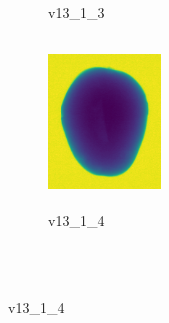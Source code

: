 \documentclass[11pt]{article}
\begin{document}
\begin{figure}
\begin{subfigure}[b]{0.15\textwidth}
        \caption{v13\_1\_3}
         \label{fig:five over x}
     \end{subfigure}
     \hfill
    \begin{subfigure}[b]{0.15\textwidth}
         \centering
         \includegraphics[width=3cm, height=4.5cm]{images/kartofler/v13_1_4_cut.png}
        \caption{v13\_1\_4}
         \label{fig:five over x}
     \end{subfigure}
     
     
        \\ \\
        

\end{figure}
\end{document}
